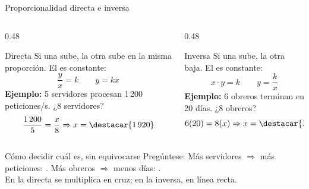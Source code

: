 \documentclass[aspectratio=169,10pt]{beamer}
\begin{document}
\begin{frame}{Proporcionalidad directa e inversa}
  \scriptsize
  \begin{columns}[T,onlytextwidth]
    \begin{column}{0.48\textwidth}
      \begin{block}{Directa}
        \tiny
        Si una sube, la otra sube en la misma proporción. El
         es constante:
        \[ \frac{y}{x} = k \qquad y = kx \]
        \textbf{Ejemplo:} 5 servidores procesan 1\,200 peticiones/s.
        ¿8 servidores?
        \[ \frac{1\,200}{5} = \frac{x}{8} \Rightarrow
           x = \destacar{1\,920} \]
      \end{block}
    \end{column}
    \begin{column}{0.48\textwidth}
      \begin{alertblock}{Inversa}
        \tiny
        Si una sube, la otra baja. El  es constante:
        \[ x\cdot y = k \qquad y = \frac{k}{x} \]
        \textbf{Ejemplo:} 6 obreros terminan en 20 días. ¿8 obreros?
        \[ 6(20) = 8(x) \Rightarrow x = \destacar{15 \text{ días}} \]
      \end{alertblock}
    \end{column}
  \end{columns}

  \vspace{0.1cm}
  \begin{exampleblock}{Cómo decidir cuál es, sin equivocarse}
    \scriptsize
    Pregúntese:  Más servidores $\Rightarrow$ más peticiones: .
    Más obreros $\Rightarrow$ menos días: . \\
    {\tiny\color{uniGris} En la directa se multiplica en cruz; en la inversa,
    en línea recta.}
  \end{exampleblock}
\end{frame}
\end{document}
